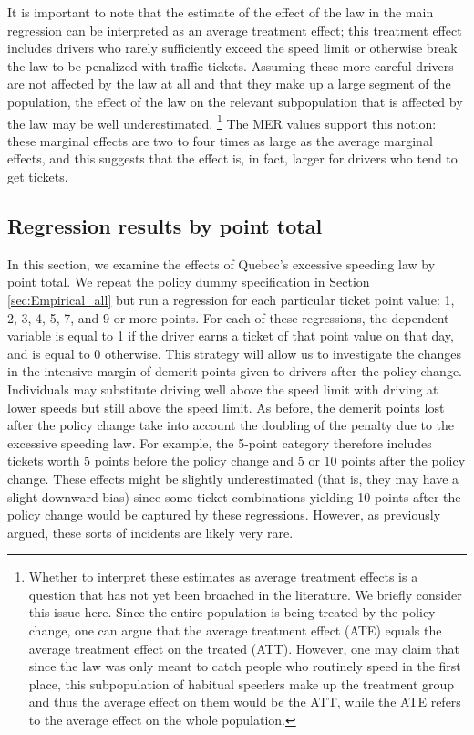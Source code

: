 It is important to note that the estimate of the effect of the law in the main regression 
can be interpreted as an average treatment effect; 
this treatment effect includes drivers who rarely sufficiently exceed the speed limit 
or otherwise break the law to be penalized with traffic tickets. 
Assuming these more careful drivers are not affected by the law at all 
and that they make up a large segment of the population, 
the effect of the law on the relevant subpopulation that is affected by the law 
may be well underestimated.%
\footnote{%
Whether to interpret these estimates as average treatment effects 
is a question that has not yet been broached in the literature. 
We briefly consider this issue here. 
Since the entire population is being treated by the policy change, 
one can argue that the average treatment effect (ATE) equals 
the average treatment effect on the treated (ATT). 
However, one may claim that since the law was only meant to catch people 
who routinely speed in the first place, 
this subpopulation of habitual speeders make up the treatment group 
and thus the average effect on them would be the ATT, 
while the ATE refers to the average effect on the whole population.
}
%
The MER values support this notion: 
these marginal effects are two to four times as large as the average marginal effects, 
and this suggests that the effect is, in fact, larger for drivers who tend to get tickets. 

\subsection{Regression results by point total}
\label{sec:Empirical_by_pts}

In this section, we examine the effects of Quebec’s excessive speeding law by point total. 
We repeat the policy dummy specification in 
Section \ref{sec:Empirical_all} 
but run a regression for each particular ticket point value: 1, 2, 3, 4, 5, 7, and 9 or more points. 
For each of these regressions, the dependent variable is equal to 1 
if the driver earns a ticket of that point value on that day, and is equal to 0 otherwise. 
This strategy will allow us to investigate the changes in the intensive margin of 
demerit points given to drivers after the policy change. 
Individuals may substitute driving well above the speed limit with driving at lower speeds 
but still above the speed limit. 
As before, the demerit points lost after the policy change take into account 
the doubling of the penalty due to the excessive speeding law. 
For example, the 5-point category therefore includes tickets 
worth 5 points before the policy change and 5 or 10 points after the policy change. 
These effects might be slightly underestimated (that is, they may have a slight downward bias) 
since some ticket combinations yielding 10 points after the policy change 
would be captured by these regressions. 
However, as previously argued, these sorts of incidents are likely very rare. 


